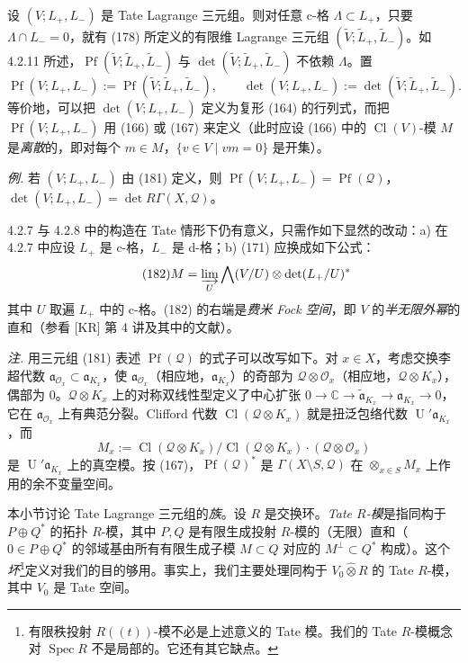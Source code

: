 设 $(V;L_{+},L_{-})$ 是 Tate Lagrange 三元组。则对任意 c-格 $\Lambda\subset L_{+}$，只要 $\Lambda\cap L_{-}=0$，就有 (178) 所定义的有限维 Lagrange 三元组 $(\tilde{V};\tilde{L}_{+},\tilde{L}_{-})$。如 4.2.11 所述，$\operatorname{Pf}(\tilde{V};\tilde{L}_{+},\tilde{L}_{-})$ 与 $\det(\tilde{V};\tilde{L}_{+},\tilde{L}_{-})$ 不依赖 $\Lambda$。置
\[
\operatorname{Pf}(V;L_{+},L_{-}):=\operatorname{Pf}(\tilde{V};\tilde{L}_{+},\tilde{L}_{-}),\qquad
\det(V;L_{+},L_{-}):=\det(\tilde{V};\tilde{L}_{+},\tilde{L}_{-}).
\]
等价地，可以把 $\det(V;L_{+},L_{-})$ 定义为复形 (164) 的行列式，而把 $\operatorname{Pf}(V;L_{+},L_{-})$ 用 (166) 或 (167) 来定义（此时应设 (166) 中的 $\operatorname{Cl}(V)$-模 $M$ 是\emph{离散}的，即对每个 $m\in M$，$\{v\in V\mid vm=0\}$ 是开集）。

\emph{例.} 若 $(V;L_{+},L_{-})$ 由 (181) 定义，则 $\operatorname{Pf}(V;L_{+},L_{-})=\operatorname{Pf}(\mathcal{Q})$，$\det(V;L_{+},L_{-})=\det R\Gamma(X,\mathcal{Q})$。

4.2.7 与 4.2.8 中的构造在 Tate 情形下仍有意义，只需作如下显然的改动：a) 在 4.2.7 中应设 $L_{+}$ 是 c-格，$L_{-}$ 是 d-格；b) (171) 应换成如下公式：
\begin{equation}\tag{182}
M=\varinjlim_{U}\bigwedge(V/U)\otimes\det(L_{+}/U)^{*}
\end{equation}
其中 $U$ 取遍 $L_{+}$ 中的 c-格。(182) 的右端是\emph{费米 Fock 空间}，即 $V$ 的\emph{半无限外幂}的直和（参看 [KR] 第 4 讲及其中的文献）。

\emph{注.} 用三元组 (181) 表述 $\operatorname{Pf}(\mathcal{Q})$ 的式子可以改写如下。对 $x\in X$，考虑交换李超代数 $\mathfrak{a}_{\mathcal{O}_{x}}\subset\mathfrak{a}_{K_{x}}$，使 $\mathfrak{a}_{\mathcal{O}_{x}}$（相应地，$\mathfrak{a}_{K_{x}}$）的奇部为 $\mathcal{Q}\otimes\mathcal{O}_{x}$（相应地，$\mathcal{Q}\otimes K_{x}$），偶部为 $0$。$\mathcal{Q}\otimes K_{x}$ 上的对称双线性型定义了中心扩张 $0\to\mathbb{C}\to\tilde{\mathfrak{a}}_{K_{x}}\to\mathfrak{a}_{K_{x}}\to 0$，它在 $\mathfrak{a}_{\mathcal{O}_{x}}$ 上有典范分裂。Clifford 代数 $\operatorname{Cl}(\mathcal{Q}\otimes K_{x})$ 就是扭泛包络代数 $\operatorname{U}'\mathfrak{a}_{K_{x}}$，而
\[
M_{x}:=\operatorname{Cl}(\mathcal{Q}\otimes K_{x})/\operatorname{Cl}(\mathcal{Q}\otimes K_{x})\cdot(\mathcal{Q}\otimes\mathcal{O}_{x})
\]
是 $\operatorname{U}'\mathfrak{a}_{K_{x}}$ 上的真空模。按 (167)，$\operatorname{Pf}(\mathcal{Q})^{*}$ 是 $\Gamma(X\setminus S,\mathcal{Q})$ 在 $\otimes_{x\in S}M_{x}$ 上作用的余不变量空间。

 本小节讨论 Tate Lagrange 三元组的\emph{族}。设 $R$ 是交换环。\emph{Tate $R$-模}是指同构于 $P\oplus Q^{*}$ 的拓扑 $R$-模，其中 $P,Q$ 是有限生成投射 $R$-模的（无限）直和（$0\in P\oplus Q^{*}$ 的邻域基由所有有限生成子模 $M\subset Q$ 对应的 $M^{\perp}\subset Q^{*}$ 构成）。这个\emph{坏}\footnote{有限秩投射 $R((t))$-模不必是上述意义的 Tate 模。我们的 Tate $R$-模概念对 $\operatorname{Spec}R$ 不是局部的。它还有其它缺点。}定义对我们的目的够用。事实上，我们主要处理同构于 $V_{0}\hat{\otimes}R$ 的 Tate $R$-模，其中 $V_{0}$ 是 Tate 空间。

